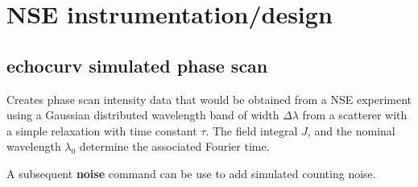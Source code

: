 \documentclass[11pt,fleqn]{book} %
\newcommand{\desc}[1]{\hskip 0.5cm {\color{descgray} #1}}
\begin{document}


\chapter{NSE instrumentation/design}

\section{echocurv \desc{simulated phase scan}}


\begin{exercise}
Creates phase scan intensity data that would be obtained from a NSE experiment using
a Gaussian distributed wavelength band of width ${\Delta \lambda}$ from a scatterer with
a simple relaxation with time constant ${\tau}$. 
The field integral ${J}$, and the nominal wavelength ${\lambda_0}$ determine the associated  Fourier time.

A subsequent {\bf noise} command can be use to add simulated counting noise. 
\end{exercise}
\end{document}

